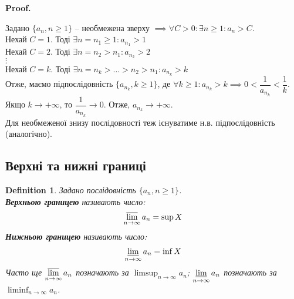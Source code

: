 \documentclass[a4paper, 14pt]{article}
\makeatletter
\def\qed{$\blacksquare$}
\theoremstyle{theoremdd}
\theoremstyle{theoremdd}
\newtheorem{definition}[theorem]{Definition}
\theoremstyle{theoremdd}
\theoremstyle{theoremdd}
\theoremstyle{theoremdd}
\theoremstyle{theoremdd}
\theoremstyle{theoremdd}
\theoremstyle{theoremdd}
\renewenvironment{proof}[1][Proof.\\]{\par
\pushQED{\hfill \qed}%
\normalfont \topsep6\p@\@plus6\p@\relax
\trivlist
\item\relax
{\bfseries
#1\@addpunct{.}}\hspace\labelsep\ignorespaces
}{%
\popQED\endtrivlist\@endpefalse
}
\makeatother
\begin{document}
	\begin{proof}
	Задано $\{a_n, n \geq 1\}$ -- необмежена зверху $\implies \forall C > 0: \exists n \geq 1: a_n > C$.\\
	Нехай $C = 1$. Тоді $\exists n = n_1 \geq 1: a_{n_1} > 1$\\
	Нехай $C = 2$. Тоді $\exists n = n_2 > n_1: a_{n_2} > 2$\\
	$\vdots$\\
	Нехай $C = k$. Тоді $\exists n = n_k > \dots > n_2 > n_1: a_{n_k} > k$\\
	Отже, маємо підпослідовність $\{a_{n_k}, k \geq 1\}$, де $\forall k \geq 1: a_{n_k} > k \implies 0 <\dfrac{1}{a_{n_k}} < \dfrac{1}{k}$. Якщо $k \to +\infty$, то $\dfrac{1}{a_{n_k}} \to 0$. Отже, $a_{n_k} \to +\infty$.\bigskip \\
	Для необмеженої знизу послідовності теж існуватиме н.в. підпослідовність (аналогічно).
	\end{proof}
	
	\subsection{Верхні та нижні границі}
	\begin{definition} Задано послідовність $\{a_n, n \geq 1\}$.\\
	\textbf{Верхньою границею} називають число:
	\begin{align*}
	\displaystyle \varlimsup_{n \to \infty} a_n = \sup X
	\end{align*}
	\textbf{Нижньою границею} називають число:
	\begin{align*}
	\displaystyle \varliminf_{n \to \infty} a_n = \inf X
	\end{align*}
	Часто ще $\displaystyle\varlimsup_{n \to \infty} a_n$ позначають за $\displaystyle\limsup_{n \to \infty} a_n$; $\displaystyle\varliminf_{n \to \infty} a_n$ позначають за $\displaystyle\liminf_{n \to \infty} a_n$.
	\end{definition}
	
\end{document}
